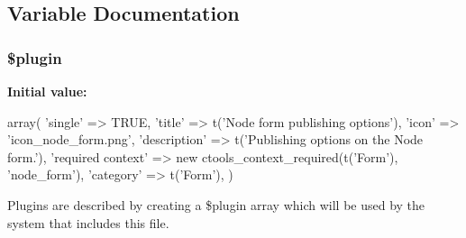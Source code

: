 \subsection{Variable Documentation}
\hypertarget{node__form__publishing_8inc_ada8a7130088351710bb02ed622d6bf65}{
\subsubsection[{\$plugin}]{\setlength{\rightskip}{0pt plus 5cm}\$plugin}}
\label{node__form__publishing_8inc_ada8a7130088351710bb02ed622d6bf65}
{\bfseries Initial value:}
\begin{DoxyCode}
 array(
  'single' => TRUE,
  'title' => t('Node form publishing options'),
  'icon' => 'icon_node_form.png',
  'description' => t('Publishing options on the Node form.'),
  'required context' => new ctools_context_required(t('Form'), 'node_form'),
  'category' => t('Form'),
)
\end{DoxyCode}
Plugins are described by creating a \$plugin array which will be used by the system that includes this file. 